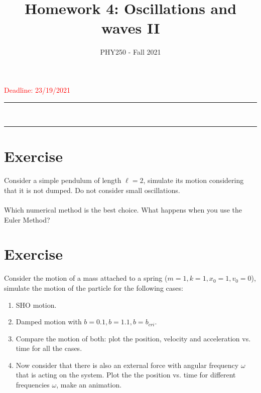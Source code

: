 \documentclass[12pt]{article}
\title{Homework 4: Oscillations and waves II}
\author{PHY250 - Fall 2021}
\date{}
\newcommand{\HRule}{\rule{\linewidth}{0.5mm}}
\begin{document}
\maketitle

\textcolor{red}{Deadline: 23/19/2021}

\vspace{5mm}

\begin{spacing}{0.3}
    \noindent
    \HRule\\
    \HRule
\end{spacing}
\vspace{5mm}




\setcounter{example}{1}

\section*{Exercise \theexample }
Consider a simple pendulum of length $\ell=2$,  simulate its motion considering that it is not dumped. Do not consider small oscillations.\\
\vspace{3mm}
\\
Which numerical method is the best choice. What happens when you use the Euler Method? 


\section*{Exercise \theexample }

Consider the motion of a mass attached to a spring ($m=1,k=1,x_0=1,v_0=0$), simulate the motion of the particle for the following cases:

\begin{enumerate}
    \item SHO motion.
    \item Damped motion with $b=0.1,b=1.1,b=b_{cri}$. 
    \item Compare the motion of both: plot the position, velocity and acceleration vs. time for all the cases.
    \item Now consider that there is also an external force with angular frequency $\omega$  that is acting on the system. Plot the the position vs. time for different frequencies $\omega$, make an animation.     
\end{enumerate}
\end{document}
